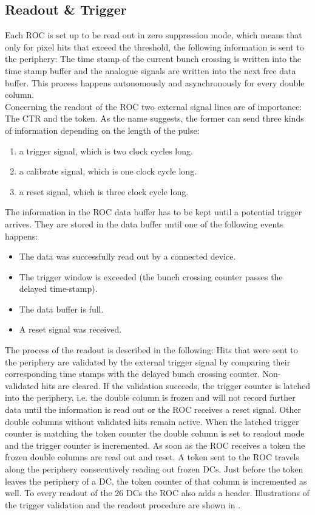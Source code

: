 \documentclass[british,11pt,a4paper]{memoir}
\begin{document}
\subsection{Readout \& Trigger}\label{sread}
Each \ac{ROC} is set up to be read out in zero suppression mode, which means that only for pixel hits that exceed the threshold, the following information is sent to the periphery: The time stamp of the current bunch crossing is written into the time stamp buffer and the analogue signals are written into the next free data buffer. This process happens autonomously and asynchronously for every double column.\\
Concerning the readout of the \ac{ROC} two external signal lines are of importance: The \ac{CTR} and the token. As the name suggests, the former can send three kinds of information depending on the length of the pulse:
\begin{enumerate}
	\item a trigger signal, which is two clock cycles long.
	\item a calibrate signal, which is one clock cycle long.
	\item a reset signal, which is three clock cycle long.
\end{enumerate}
The information in the \ac{ROC} data buffer has to be kept until a potential trigger arrives. They are stored in the data buffer until one of the following events happens: 
\begin{itemize}
	\item The data was successfully read out by a connected device.
	\item The trigger window is exceeded (the bunch crossing counter passes the delayed time-stamp).
	\item The data buffer is full.
	\item A reset signal was received.
\end{itemize}
The process of the readout is described in the following: Hits that were sent to the periphery are validated by the external trigger signal by comparing their corresponding time stamps with the delayed bunch crossing counter. Non-validated hits are cleared. If the validation succeeds, the trigger counter is latched into the periphery, i.e. the double column is frozen and will not record further data until the information is read out or the \ac{ROC} receives a reset signal. Other double columns without validated hits remain active. When the latched trigger counter is matching the token counter the double column is set to readout mode and the trigger counter is incremented. As soon as the \ac{ROC} receives a token the frozen double columns are read out and reset. A token sent to the \ac{ROC} travels along the periphery consecutively reading out frozen \ac{DC}s. Just before the token leaves the periphery of a \ac{DC}, the token counter of that column is incremented as well. To every readout of the $26$ \ac{DC}s the \ac{ROC} also adds a header. Illustrations of the trigger validation and the readout procedure are shown in .
\end{document}
